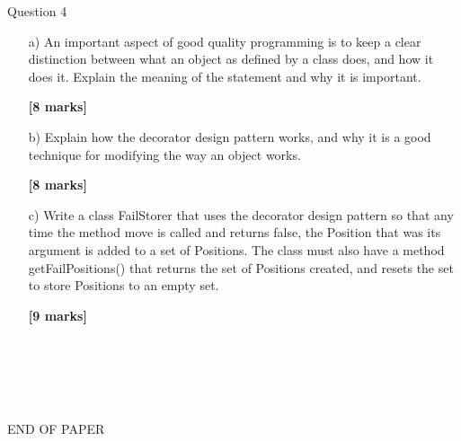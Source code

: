 \documentclass[11pt]{article}
\begin{document}
          Question 4
        \begin{enumerate}
            
        \item[a) ]An important aspect of good quality programming is to keep a clear distinction between what an object as defined by a class does, and how it does it. Explain the meaning of the statement and why it is important.
        \begin{flushright}
            \textbf{[8 marks]}
        \end{flushright}
    
        \item[b) ]Explain how the decorator design pattern works, and why it is a good technique for modifying the way an object works.
        \begin{flushright}
            \textbf{[8 marks]}
        \end{flushright}
    
        \item[c) ]Write a class FailStorer that uses the decorator design pattern so that any time the method move is called and returns false, the Position that was its argument is added to a set of Positions. The class must also have a method getFailPositions() that returns the set of Positions created, and resets the set to store Positions to an empty set.
        \begin{flushright}
            \textbf{[9 marks]}
        \end{flushright}
    
        \end{enumerate}
        ~\\
    
	
	
	~\\~\\~\\
	\begin{center}
		END OF PAPER
	\end{center}
	
	
	\label{unknown}
\end{document}
